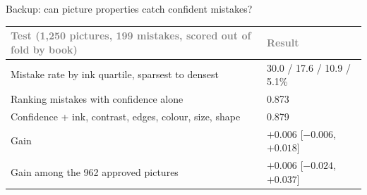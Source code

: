 \documentclass[aspectratio=169,11pt]{beamer}
\newcommand{\h}[1]{\textcolor{grey}{#1}}
\newcommand{\remark}[1]{\par\vspace{0.35cm}{\small\textcolor{grey}{#1}}}
\begin{document}
\begin{frame}{Backup: can picture properties catch confident mistakes?}
\begin{tabular}{@{}L{9.2cm} C{4.2cm}@{}}
\toprule
\h{Test (1,250 pictures, 199 mistakes, scored out of fold by book)} & \h{Result}\\
\midrule
Mistake rate by ink quartile, sparsest to densest & 30.0 / 17.6 / 10.9 / 5.1\%\\
Ranking mistakes with confidence alone & 0.873\\
Confidence + ink, contrast, edges, colour, size, shape & 0.879\\
Gain & $+0.006$ [$-0.006$, $+0.018$]\\
Gain among the 962 approved pictures & $+0.006$ [$-0.024$, $+0.037$]\\
\bottomrule
\end{tabular}
\remark{The blind spot is real, but confidence already sees sparseness. The remaining confident mistakes are not visible to simple pixel statistics.}
\end{frame}
\end{document}
